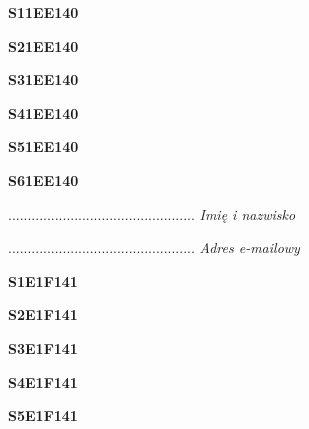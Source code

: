 \begin{turn}{90}\huge \textbf{S11EE140}\end{turn}

\begin{turn}{90}\huge \textbf{S21EE140}\end{turn}

\begin{turn}{90}\huge \textbf{S31EE140}\end{turn}

\begin{turn}{90}\huge \textbf{S41EE140}\end{turn}

\begin{turn}{90}\huge \textbf{S51EE140}\end{turn}

\begin{turn}{90}\huge \textbf{S61EE140}\end{turn}

\begin{turn}{90}\begin{minipage}{\linewidth} \vspace{20mm} ................................................  \textit{Imię i nazwisko}\end{minipage}\end{turn}

\begin{turn}{90}\begin{minipage}{\linewidth} \vspace{20mm} ................................................  \textit{Adres e-mailowy}\end{minipage}\end{turn}

\begin{turn}{90}\huge \textbf{S1E1F141}\end{turn}

\begin{turn}{90}\huge \textbf{S2E1F141}\end{turn}

\begin{turn}{90}\huge \textbf{S3E1F141}\end{turn}

\begin{turn}{90}\huge \textbf{S4E1F141}\end{turn}

\begin{turn}{90}\huge \textbf{S5E1F141}\end{turn}

